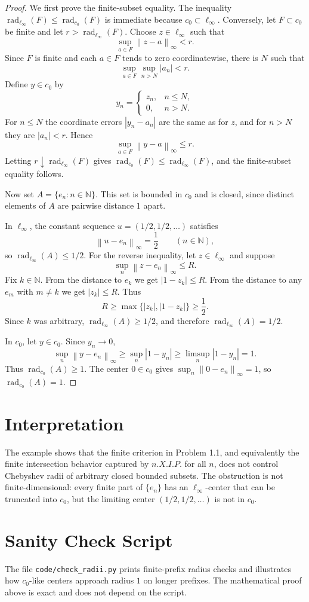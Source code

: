 \documentclass[11pt]{article}
\newcommand{\N}{\mathbb N}
\newcommand{\rad}{\operatorname{rad}}
\newcommand{\norm}[1]{\left\lVert #1 \right\rVert}
\begin{document}
\begin{proof}
We first prove the finite-subset equality. The inequality
$\rad_{\ell_\infty}(F)\le\rad_{c_0}(F)$ is immediate because
$c_0\subset\ell_\infty$. Conversely, let $F\subset c_0$ be finite and let
$r>\rad_{\ell_\infty}(F)$. Choose $z\in\ell_\infty$ such that
\[
  \sup_{a\in F}\norm{z-a}_\infty<r.
\]
Since $F$ is finite and each $a\in F$ tends to zero coordinatewise, there is
$N$ such that
\[
  \sup_{a\in F}\sup_{n>N}|a_n|<r.
\]
Define $y\in c_0$ by
\[
  y_n=
  \begin{cases}
    z_n, & n\le N,\\
    0, & n>N.
  \end{cases}
\]
For $n\le N$ the coordinate errors $|y_n-a_n|$ are the same as for $z$, and
for $n>N$ they are $|a_n|<r$. Hence
\[
  \sup_{a\in F}\norm{y-a}_\infty\le r.
\]
Letting $r\downarrow\rad_{\ell_\infty}(F)$ gives
$\rad_{c_0}(F)\le\rad_{\ell_\infty}(F)$, and the finite-subset equality
follows.

Now set $A=\{e_n:n\in\N\}$. This set is bounded in $c_0$ and is closed, since
distinct elements of $A$ are pairwise distance $1$ apart.

In $\ell_\infty$, the constant sequence $u=(1/2,1/2,\ldots)$ satisfies
\[
  \norm{u-e_n}_\infty=\frac12
  \qquad(n\in\N),
\]
so $\rad_{\ell_\infty}(A)\le1/2$. For the reverse inequality, let
$z\in\ell_\infty$ and suppose
\[
  \sup_n\norm{z-e_n}_\infty\le R.
\]
Fix $k\in\N$. From the distance to $e_k$ we get $|1-z_k|\le R$. From the
distance to any $e_m$ with $m\ne k$ we get $|z_k|\le R$. Thus
\[
  R\ge\max\{|z_k|,|1-z_k|\}\ge\frac12.
\]
Since $k$ was arbitrary, $\rad_{\ell_\infty}(A)\ge1/2$, and therefore
$\rad_{\ell_\infty}(A)=1/2$.

In $c_0$, let $y\in c_0$. Since $y_n\to0$,
\[
  \sup_n\norm{y-e_n}_\infty
  \ge
  \sup_n |1-y_n|
  \ge
  \limsup_n |1-y_n|
  =
  1.
\]
Thus $\rad_{c_0}(A)\ge1$. The center $0\in c_0$ gives
$\sup_n\norm{0-e_n}_\infty=1$, so $\rad_{c_0}(A)=1$.
\end{proof}

\section*{Interpretation}

The example shows that the finite criterion in Problem 1.1, and equivalently
the finite intersection behavior captured by $n.X.I.P.$ for all $n$, does not
control Chebyshev radii of arbitrary closed bounded subsets. The obstruction is
not finite-dimensional: every finite part of $\{e_n\}$ has an
$\ell_\infty$-center that can be truncated into $c_0$, but the limiting center
$(1/2,1/2,\ldots)$ is not in $c_0$.

\section*{Sanity Check Script}

The file \texttt{code/check\_radii.py} prints finite-prefix radius checks and
illustrates how $c_0$-like centers approach radius $1$ on longer prefixes. The
mathematical proof above is exact and does not depend on the script.
\end{document}
